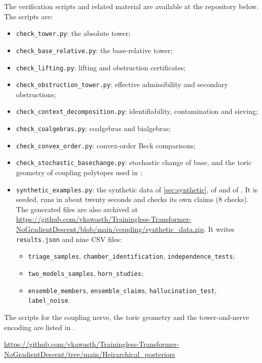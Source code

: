 \documentclass[11pt]{article}
\theoremstyle{definition}
\theoremstyle{remark}
\begin{document}
The verification scripts and related material are available at the repository below. The scripts
are:
\begin{itemize}[leftmargin=*,nosep]
\item \texttt{check\_tower.py}: the absolute tower;
\item \texttt{check\_base\_relative.py}: the base-relative tower;
\item \texttt{check\_lifting.py}: lifting and obstruction certificates;
\item \texttt{check\_obstruction\_tower.py}: effective admissibility and secondary obstructions;
\item \texttt{check\_context\_decomposition.py}: identifiability, contamination and sieving;
\item \texttt{check\_coalgebras.py}: coalgebras and bialgebras;
\item \texttt{check\_convex\_order.py}: convex-order Beck comparisons;
\item \texttt{check\_stochastic\_basechange.py}: stochastic change of base, and the toric geometry of
  coupling polytopes used in \cite{Awasthi-Attribution,Conditionals};
\item \texttt{synthetic\_examples.py}: the synthetic data of \cref{sec:synthetic}, of
  \cite[Section~12]{Conditionals} and of \cite[Section~15]{Awasthi-Family}. It is seeded, runs in about twenty
  seconds and checks its own claims (8 checks). The generated files are also archived at \url{https://github.com/vkawasth/Trainingless-Transformer-NoGradientDescent/blob/main/coupling/synthetic_data.zip}. It writes \texttt{results.json} and nine CSV files:
  \begin{itemize}[nosep]
  \item \texttt{triage\_samples}, \texttt{chamber\_identification}, \texttt{independence\_tests};
  \item \texttt{two\_models\_samples}, \texttt{horn\_studies};
  \item \texttt{ensemble\_members}, \texttt{ensemble\_claims}, \texttt{hallucination\_test}, \texttt{label\_noise}.
  \end{itemize}
\end{itemize}
The scripts for the coupling nerve, the toric geometry and the tower-and-nerve encoding are listed in
\cite[Section~14]{Conditionals}.
\begin{center}\small\url{https://github.com/vkawasth/Trainingless-Transformer-NoGradientDescent/tree/main/Heirarchical_posteriors}\end{center}
\end{document}
